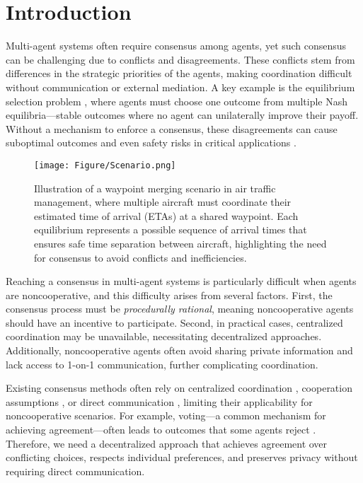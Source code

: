 \section{Introduction}

Multi-agent systems often require consensus among agents, yet such consensus can be challenging due to conflicts and disagreements. These conflicts stem from differences in the strategic priorities of the agents, making coordination difficult without communication or external mediation. A key example is the equilibrium selection problem \cite{nonCoop_2_shared}, where agents must choose one outcome from multiple Nash equilibria—stable outcomes where no agent can unilaterally improve their payoff. Without a mechanism to enforce a consensus,  these disagreements can cause suboptimal outcomes and even safety risks in critical applications \cite{infer_1, infer_2}. 

\begin{figure}
    \centering
    \texttt{[image: Figure/Scenario.png]}
    \caption{Illustration of a waypoint merging scenario in air traffic management, where multiple aircraft must coordinate their estimated time of arrival (ETAs) at a shared waypoint. Each equilibrium represents a possible sequence of arrival times that ensures safe time separation between aircraft, highlighting the need for consensus to avoid conflicts and inefficiencies.}
    \label{fig:scenarioDescription}
\end{figure}

Reaching a consensus in multi-agent systems is particularly difficult when agents are noncooperative, and this difficulty arises from several factors. First, the consensus process must be \textit{procedurally rational}, meaning noncooperative agents should have an incentive to participate. Second, in practical cases, centralized coordination may be unavailable, necessitating decentralized approaches. Additionally, noncooperative agents often avoid sharing private information and lack access to 1-on-1 communication, further complicating coordination.

Existing consensus methods often rely on centralized coordination \cite{Coop_1_monotone, Coop_2_potential, Coop_3_hetero, Coop_6, Coop_8, Coop_9}, cooperation assumptions \cite{nonCoop_4_linear, nonCoop_5_linear, nonCoop_2_shared, nonCoop_1_coord}, or direct communication \cite{Coop_4_comm_priv, Coop_5_comm_priv, Coop_7_comm_priv}, limiting their applicability for noncooperative scenarios. For example, voting—a common mechanism for achieving agreement—often leads to outcomes that some agents reject \cite{nego_shoham}. Therefore, we need a decentralized approach that achieves agreement over conflicting choices, respects individual preferences, and preserves privacy without requiring direct communication.

